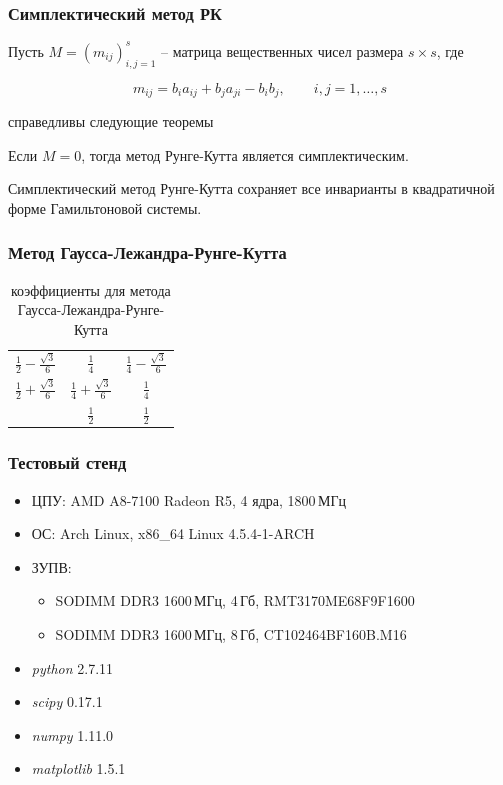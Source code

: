 \documentclass[t]{beamer}
\begin{document}
\begin{frame}
    \frametitle{Симплектический метод РК}

    Пусть $M=\left( m_{ij} \right)^s_{i,j=1}$ -- матрица вещественных чисел размера
    $s\times s$, где
    \begin{block}{}
        \begin{equation*}
            m_{ij} = b_i a_{ij} + b_j a_{ji} - b_i b_j,\qquad i,j=1,\dots,s
        \end{equation*}
    \end{block}
     справедливы следующие теоремы
    \begin{theorem}
        Если $M = 0$, тогда метод Рунге-Кутта является симплектическим.
    \end{theorem}
    \begin{theorem}\label{th:quadratic-integrals}
        Симплектический метод Рунге-Кутта сохраняет все инварианты в квадратичной
        форме Гамильтоновой системы.
    \end{theorem}
\end{frame}


\begin{frame}[c]
    \frametitle{Метод Гаусса-Лежандра-Рунге-Кутта}
    \begin{table}[h]
        \renewcommand{\arraystretch}{1.8}
        \begin{tabular}{c|cc}
            $\frac12 - \frac{\sqrt3}6$ & $\frac14$                  & $\frac14 - \frac{\sqrt3}6$ \\
            $\frac12 + \frac{\sqrt3}6$ & $\frac14 + \frac{\sqrt3}6$ & $\frac14$ \\ \hline
                                       & $\frac12$                  & $\frac12$
        \end{tabular}
        \caption{коэффициенты для метода Гаусса-Лежандра-Рунге-Кутта}
    \end{table}
\end{frame}



\begin{frame}
    \frametitle{Тестовый стенд}
    \begin{itemize}
        \item ЦПУ: AMD A8-7100 Radeon R5, 4 ядра, 1800\,МГц
        \item ОС: Arch Linux, x86\_64 Linux 4.5.4-1-ARCH
        \item ЗУПВ:
            \begin{itemize}
                \item SODIMM DDR3 1600\,МГц, 4\,Гб, RMT3170ME68F9F1600
                \item SODIMM DDR3 1600\,МГц, 8\,Гб, CT102464BF160B.M16
            \end{itemize}
        \item \emph{python} 2.7.11
        \item \emph{scipy} 0.17.1
        \item \emph{numpy} 1.11.0
        \item \emph{matplotlib} 1.5.1
    \end{itemize}
\end{frame}
\end{document}
